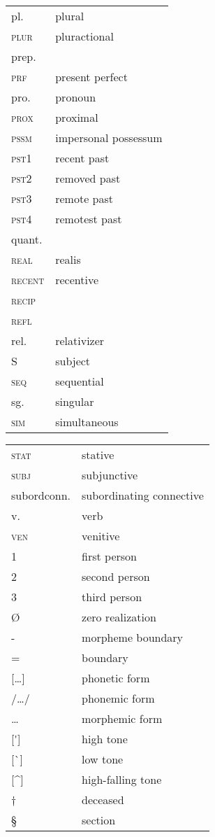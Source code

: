\begin{tabularx}{.48\textwidth}{lQ} 
pl.					&	 plural \\
\textsc{plur}		&	 pluractional \\
prep.				&	  \\
\textsc{prf}		&	 present perfect \\
pro.				&	 pronoun \\
\textsc{prox}		&	 proximal \\
\textsc{pssm}		&	 impersonal possessum \\ 
\textsc{pst1}		&	 recent past  \\
\textsc{pst2}		&	 removed past  \\
\textsc{pst3}		&	 remote past  \\
\textsc{pst4}		&	 remotest past  \\
quant.				&	  \\
\textsc{real}		&	 realis \\
\textsc{recent}		&	 recentive \\
\textsc{recip}		&	  \\
\textsc{refl}		&	  \\
rel.				&	 relativizer \\
S					&	  subject \\
\textsc{seq}		&	 sequential \\
sg.					&	 singular \\
\textsc{sim}		&	 simultaneous \\
\end{tabularx}
\begin{tabularx}{.45\textwidth}{lQ} 
\textsc{stat}		&	 stative \\
\textsc{subj}		&	 subjunctive \\
subordconn.			&	 subordinating connective \\
v.					&	 verb \\
\textsc{ven}		&	 venitive \\
1					&	 first person \\
2					&	 second person \\
3					&	 third person \\
Ø					&	 zero realization \\
-					&	 morpheme boundary \\
=					&	  boundary \\{}
[{\dots}]			&	 phonetic form\\{}
/{\dots}/			&	 phonemic form\\{}
{{\dots}}			&	 morphemic form\\{}
[\'{}]				&	 high tone \\{}
[\`{}]				&	 low tone \\{}
[\^{}]				&	 high-falling tone \\
†					&	 deceased \\
§					&	 section \\ 
\end{tabularx}

  